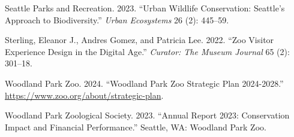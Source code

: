 \documentclass[
  Letterpaper,
]{scrbook}
\newlength{\cslhangindent}
\newenvironment{CSLReferences}[2] %
 {\begin{list}{}{%
  \setlength{\itemindent}{0pt}
  \setlength{\leftmargin}{0pt}
  \setlength{\parsep}{0pt}
  \ifodd #1
   \setlength{\leftmargin}{\cslhangindent}
   \setlength{\itemindent}{-1\cslhangindent}
  \fi
  \setlength{\itemsep}{#2\baselineskip}}}
 {\end{list}}
\begin{document}
\begin{CSLReferences}{1}{0}
Seattle Parks and Recreation. 2023. {``Urban Wildlife Conservation:
Seattle's Approach to Biodiversity.''} \emph{Urban Ecosystems} 26 (2):
445--59.

Sterling, Eleanor J., Andres Gomez, and Patricia Lee. 2022. {``Zoo
Visitor Experience Design in the Digital Age.''} \emph{Curator: The
Museum Journal} 65 (2): 301--18.

Woodland Park Zoo. 2024. {``Woodland Park Zoo Strategic Plan
2024-2028.''} \url{https://www.zoo.org/about/strategic-plan}.

Woodland Park Zoological Society. 2023. {``Annual Report 2023:
Conservation Impact and Financial Performance.''} Seattle, WA: Woodland
Park Zoo.

\end{CSLReferences}


\backmatter
\end{document}
